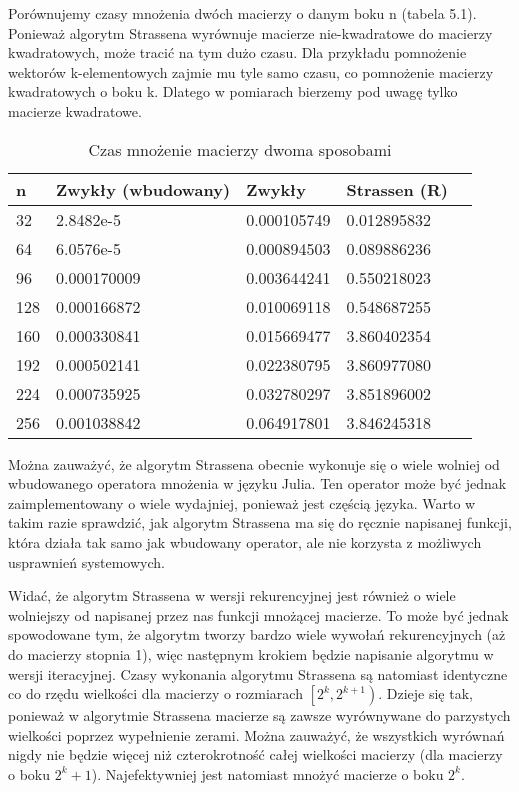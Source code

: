 \documentclass[paper=a4, fontsize=11pt]{scrartcl} %
\numberwithin{equation}{section} %
\numberwithin{figure}{section} %
\numberwithin{table}{section} %
\begin{document}
Porównujemy czasy mnożenia dwóch macierzy o danym boku n (tabela 5.1).
Ponieważ algorytm Strassena wyrównuje macierze nie-kwadratowe do macierzy kwadratowych, może tracić na tym dużo czasu.
Dla przykładu pomnożenie wektorów k-elementowych zajmie mu tyle samo czasu, co pomnożenie macierzy kwadratowych o boku k.
Dlatego w pomiarach bierzemy pod uwagę tylko macierze kwadratowe.\medbreak
\begin{table}[]
\caption{Czas mnożenie macierzy dwoma sposobami}
\label{my-label}
\begin{tabular}{|l|l|l|l|l|}
\hline
n	&	Zwykły (wbudowany)	&	Zwykły	&	Strassen (R) &	\\  \hline
32	&	2.8482e-5	&	0.000105749	&	0.012895832	&\\  \hline
64	&	6.0576e-5	&	0.000894503	&	0.089886236	&\\  \hline
96	&	0.000170009	&	0.003644241	&	0.550218023	&\\  \hline
128	&	0.000166872	&	0.010069118	&	0.548687255	&\\  \hline
160	&	0.000330841	&	0.015669477	&	3.860402354	&\\  \hline
192	&	0.000502141	&	0.022380795	&	3.860977080	&\\  \hline
224	&	0.000735925	&	0.032780297	&	3.851896002	&\\  \hline
256 &	0.001038842	&	0.064917801	&	3.846245318	&\\
\hline
\end{tabular}
\end{table}

Można zauważyć, że algorytm Strassena obecnie wykonuje się o wiele wolniej od wbudowanego operatora mnożenia w języku Julia.
Ten operator może być jednak zaimplementowany o wiele wydajniej, ponieważ jest częścią języka.
Warto w takim razie sprawdzić, jak algorytm Strassena ma się do ręcznie napisanej
funkcji, która działa tak samo jak wbudowany operator, ale nie korzysta z możliwych usprawnień systemowych.\medbreak

Widać, że algorytm Strassena w wersji rekurencyjnej jest również o wiele wolniejszy od napisanej przez nas funkcji mnożącej macierze.
To może być jednak spowodowane tym, że algorytm tworzy bardzo wiele wywołań rekurencyjnych (aż do macierzy stopnia 1),
więc następnym krokiem będzie napisanie algorytmu w wersji iteracyjnej. \medbreak
Czasy wykonania algorytmu Strassena są natomiast identyczne co do rzędu wielkości dla macierzy o rozmiarach ${\left[2^k, 2^{k+1} \right)}$.
Dzieje się tak, ponieważ w algorytmie Strassena macierze są zawsze wyrównywane do parzystych wielkości poprzez wypełnienie zerami.
Można zauważyć, że wszystkich wyrównań nigdy nie będzie więcej niż czterokrotność całej wielkości macierzy (dla macierzy o boku ${2^k+1}$).
Najefektywniej jest natomiast mnożyć macierze o boku ${2^k}$.\medbreak
\end{document}
